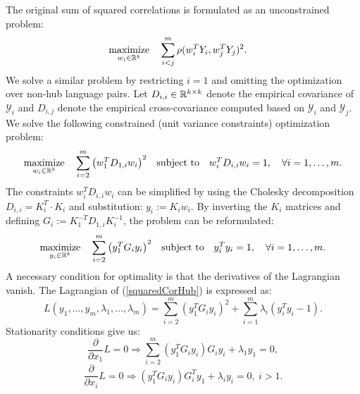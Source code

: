 The original sum of squared correlations is formulated as an unconstrained problem:
\begin{equation*}
  \begin{aligned}
    & \underset{w_i \in \mathbb{R}^{k}}{\text{maximize}}
    & & \sum_{i < j}^m  \rho(w_i^T Y_i, w_j^T Y_j)^2.
\end{aligned}
\end{equation*}
We solve a similar problem by restricting $i=1$ and omitting the optimization over non-hub
language pairs. Let $D_{i,i} \in \mathbb{R}^{k \times k}$ denote the empirical covariance of
$\mathcal{Y}_i$ and $D_{i,j}$ denote the empirical cross-covariance computed based on
$\mathcal{Y}_i$ and $\mathcal{Y}_j$. We solve the following constrained (unit variance
constraints) optimization problem:
\begin{equation}\label{squaredCorHubOriginal}
  \begin{aligned}
    & \underset{w_i \in \mathbb{R}^{k}}{\text{maximize}}
    & & \sum_{i = 2}^m  \left(w_1^T D_{1,i} w_i \right)^2
    & \text{subject to}
    & & w_i^T D_{i,i} w_i = 1, \quad\forall i = 1,\ldots, m.
\end{aligned}
\end{equation}
The constraints $w_i^T D_{i,i} w_i$ can be simplified by using the Cholesky decomposition
$D_{i,i} = K_i^T \cdot K_i$ and substitution: $y_i := K_i w_i$. By inverting the $K_i$
matrices and defining  $G_i := K_1^{-T} D_{1,i} K_i^{-1}$, the problem can be reformulated:
\begin{equation}\label{squaredCorHub}
  \begin{aligned}
    & \underset{y_i \in \mathbb{R}^{k}}{\text{maximize}}
    & & \sum_{i = 2}^m  \left(y_1^T G_{i} y_i \right)^2
    & \text{subject to}
    & & y_i^T y_i = 1, \quad\forall i = 1,\ldots, m.
\end{aligned}
\end{equation}
A necessary condition for optimality is that the derivatives of the Lagrangian vanish.
The Lagrangian of (\ref{squaredCorHub}) is expressed as:
$$  L(y_1, \ldots, y_m, \lambda_1, \ldots, \lambda_m) =
\sum_{i = 2}^m  \left(y_1^T G_{i} y_i \right)^2 + \sum_{i=1}^m \lambda_i \left(y_i^T y_i - 1\right).$$
Stationarity conditions give us:
\begin{equation}\label{dLdx1}
 \frac{\partial}{\partial x_1} L = 0 \Rightarrow
 \sum_{i = 2}^m  \left(y_1^T G_{i} y_i \right) G_i y_i + \lambda_1 y_1 = 0,
\end{equation}
\begin{equation}\label{dLdxi}
\frac{\partial}{\partial x_i} L = 0 \Rightarrow
\left(y_1^T G_{i} y_i \right) G_{i}^T y_1 + \lambda_i y_i = 0,~i > 1.
\end{equation}
